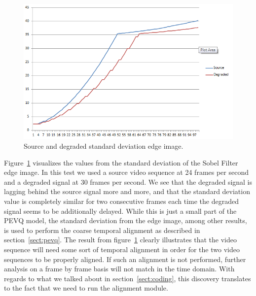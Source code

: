 \begin{figure}[h]
	\centering
	\includegraphics[width=.7\textwidth,natwidth=672,natheight=435]{images/stdDevEdgeImg.png}
	\caption{Source and degraded standard deviation edge image.}
	\label{fig:stdDevEdgeImg}
\end{figure}

Figure~\ref{fig:stdDevEdgeImg} visualizes the values from the standard deviation of the Sobel Filter edge image. In this test we used a source video sequence at 24 frames per second and a degraded signal at 30 frames per second. We see that the degraded signal is lagging behind the source signal more and more, and that the standard deviation value is completely similar for two consecutive frames each time the degraded signal seems to be additionally delayed. While this is just a small part of the PEVQ model, the standard deviation from the edge image, among other results, is used to perform the coarse temporal alignment as described in section~\ref{sect:pevq}. The result from figure~\ref{fig:stdDevEdgeImg} clearly illustrates that the video sequence will need some sort of temporal alignment in order for the two video sequences to be properly aligned. If such an alignment is not performed, further analysis on a frame by frame basis will not match in the time domain.  With regards to what we talked about in section~\ref{sect:coding}, this discovery translates to the fact that we need to run the alignment module. 


